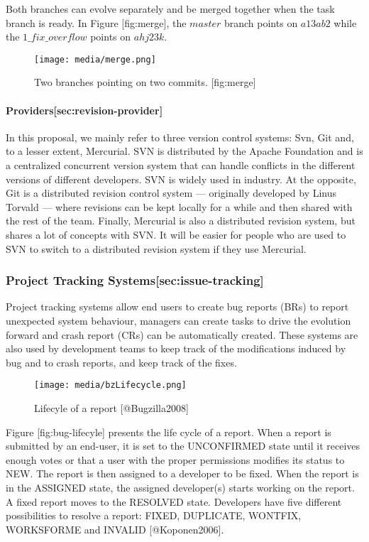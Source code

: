 Both branches can evolve separately and be merged together when the task
branch is ready. In Figure {[}fig:merge{]}, the \(master\) branch points
on \(a13ab2\) while the \(1\_fix\_overflow\) points on \(ahj23k\).

\begin{figure}[htbp]
\centering
\texttt{[image: media/merge.png]}
\caption{Two branches pointing on two commits. {[}fig:merge{]}}
\end{figure}

\paragraph{Providers{[}sec:revision-provider{]}}\label{providerssecrevision-provider}

In this proposal, we mainly refer to three version control systems:
{Svn}, {Git} and, to a lesser extent, {Mercurial}. {SVN} is distributed
by the Apache Foundation and is a centralized concurrent version system
that can handle conflicts in the different versions of different
developers. SVN is widely used in industry. At the opposite, {Git} is a
distributed revision control system --- originally developed by Linus
Torvald --- where revisions can be kept locally for a while and then
shared with the rest of the team. Finally, {Mercurial} is also a
distributed revision system, but shares a lot of concepts with {SVN}. It
will be easier for people who are used to {SVN} to switch to a
distributed revision system if they use {Mercurial}.

\subsubsection{Project Tracking
Systems{[}sec:issue-tracking{]}}\label{project-tracking-systemssecissue-tracking}

Project tracking systems allow end users to create bug reports (BRs) to
report unexpected system behaviour, managers can create tasks to drive
the evolution forward and crash report (CRs) can be automatically
created. These systems are also used by development teams to keep track
of the modifications induced by bug and to crash reports, and keep track
of the fixes.

\begin{figure}[htbp]
\centering
\texttt{[image: media/bzLifecycle.png]}
\caption{Lifecyle of a report {[}@Bugzilla2008{]}{}}
\end{figure}

Figure {[}fig:bug-lifecyle{]} presents the life cycle of a report. When
a report is submitted by an end-user, it is set to the {UNCONFIRMED}
state until it receives enough votes or that a user with the proper
permissions modifies its status to {NEW}. The report is then assigned to
a developer to be fixed. When the report is in the {ASSIGNED} state, the
assigned developer(s) starts working on the report. A fixed report moves
to the {RESOLVED} state. Developers have five different possibilities to
resolve a report: {FIXED}, {DUPLICATE}, {WONTFIX}, {WORKSFORME} and
{INVALID} {[}@Koponen2006{]}.

